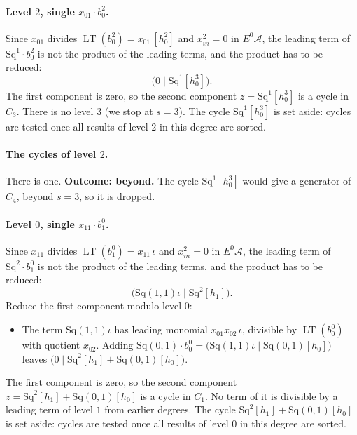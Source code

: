 \documentclass[11pt]{article}
\newcommand{\Sq}{\mathrm{Sq}}
\DeclareMathOperator{\LT}{LT}
\begin{document}
\paragraph{Level $2$, single $x_{01}\cdot b^{2}_{0}$.} Since $x_{01}$ divides $\LT(b^{2}_{0}) = x_{01}\,[h_0^2]$ and $x_{in}^2 = 0$ in $E^0\mathcal A$, the leading term of $\Sq^{1}\cdot b^{2}_{0}$ is not the product of the leading terms, and the product has to be reduced:
\[\bigl(0 \;\big|\; \Sq^{1}[h_0^3]\bigr).\]
The first component is zero, so the second component $z = \Sq^{1}[h_0^3]$ is a cycle in $C_{3}$.
There is no level $3$ (we stop at $s = 3$).
The cycle $\Sq^{1}[h_0^3]$ is set aside: cycles are tested once all results of level $2$ in this degree are sorted.
\medskip
\paragraph{The cycles of level $2$.} There is one.
\textbf{Outcome: beyond.} The cycle $\Sq^{1}[h_0^3]$ would give a generator of $C_{4}$, beyond $s = 3$, so it is dropped.
\medskip
\paragraph{Level $0$, single $x_{11}\cdot b^{0}_{1}$.} Since $x_{11}$ divides $\LT(b^{0}_{1}) = x_{11}\,\iota$ and $x_{in}^2 = 0$ in $E^0\mathcal A$, the leading term of $\Sq^{2}\cdot b^{0}_{1}$ is not the product of the leading terms, and the product has to be reduced:
\[\bigl(\Sq(1,1)\iota \;\big|\; \Sq^{2}[h_1]\bigr).\]
Reduce the first component modulo level $0$:
\begin{itemize}
\item The term $\Sq(1,1)\iota$ has leading monomial $x_{01}x_{02}\,\iota$, divisible by $\LT(b^{0}_{0})$ with quotient $x_{02}$. Adding $\Sq(0,1)\cdot b^{0}_{0} = \bigl(\Sq(1,1)\iota \;\big|\; \Sq(0,1)[h_0]\bigr)$ leaves $\bigl(0 \;\big|\; \Sq^{2}[h_1] + \Sq(0,1)[h_0]\bigr)$.
\end{itemize}
The first component is zero, so the second component $z = \Sq^{2}[h_1] + \Sq(0,1)[h_0]$ is a cycle in $C_{1}$.
No term of it is divisible by a leading term of level $1$ from earlier degrees.
The cycle $\Sq^{2}[h_1] + \Sq(0,1)[h_0]$ is set aside: cycles are tested once all results of level $0$ in this degree are sorted.
\medskip
\end{document}
